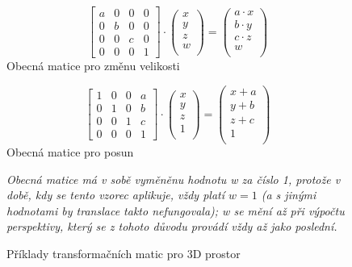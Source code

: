 \documentclass[a4paper, 11pt]{report}
\begin{document}
\begin{figure}[h]
    \begin{minipage}{0.45\textwidth}
        \[
        \begin{bmatrix}
            a&0&0&0\\
            0&b&0&0\\
            0&0&c&0\\
            0&0&0&1
        \end{bmatrix}
        \cdot
        \begin{pmatrix}
            x\\
            y\\
            z\\
            w\\
        \end{pmatrix}
        =
        \begin{pmatrix}
            a \cdot x\\
            b \cdot y\\
            c \cdot z\\
            w\\
        \end{pmatrix}
        \]
        \centering
        \small Obecná matice pro změnu velikosti
    \end{minipage}
    \qquad
    \begin{minipage}{0.45\textwidth}
        \[
        \begin{bmatrix}
            1&0&0&a\\
            0&1&0&b\\
            0&0&1&c\\
            0&0&0&1
        \end{bmatrix}
        \cdot
        \begin{pmatrix}
            x\\
            y\\
            z\\
            1\\
        \end{pmatrix}
        =
        \begin{pmatrix}
            x + a\\
            y + b\\
            z + c\\
            1\\
        \end{pmatrix}
        \]
        \centering
        \small Obecná matice pro posun
    \end{minipage}
    \caption{Příklady transformačních matic pro 3D prostor}
    \small\emph{
    Obecná matice má v sobě vyměněnu hodnotu w za číslo 1, protože v době, kdy se tento vzorec aplikuje, vždy platí \(w=1\) (a s jinými hodnotami by translace takto nefungovala); w se mění až při výpočtu perspektivy, který se z tohoto důvodu provádí vždy až jako poslední.
    }
\end{figure}
\end{document}
